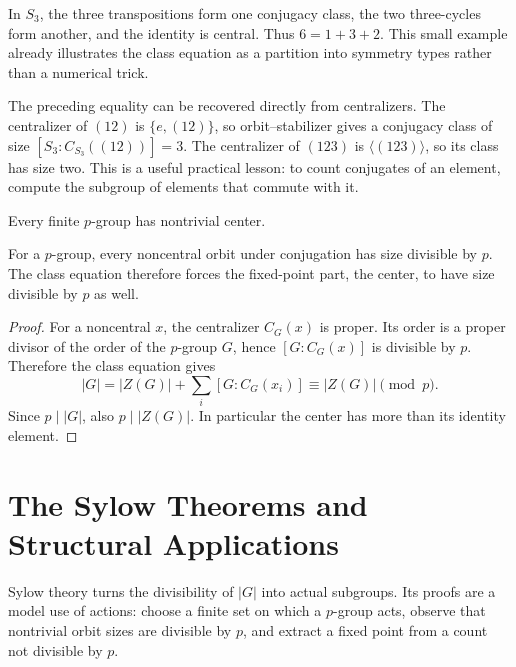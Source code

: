 \begin{example}
In \(S_3\), the three transpositions form one conjugacy class, the two
three-cycles form another, and the identity is central.  Thus
\(6=1+3+2\).  This small example already illustrates the class equation as a
partition into symmetry types rather than a numerical trick.
\end{example}

\begin{example}[Centralizers in \(S_3\)]
The preceding equality can be recovered directly from centralizers.  The
centralizer of \((12)\) is \(\{e,(12)\}\), so orbit--stabilizer gives a
conjugacy class of size \([S_3:C_{S_3}((12))]=3\).  The centralizer of
\((123)\) is \(\langle(123)\rangle\), so its class has size two.  This is a
useful practical lesson: to count conjugates of an element, compute the
subgroup of elements that commute with it.
\end{example}

\begin{corollary}
Every finite \(p\)-group has nontrivial center.
\end{corollary}
\begin{proofidea}
For a \(p\)-group, every noncentral orbit under conjugation has size divisible
by \(p\).  The class equation therefore forces the fixed-point part, the
center, to have size divisible by \(p\) as well.
\end{proofidea}
\begin{proof}
For a noncentral \(x\), the centralizer \(C_G(x)\) is proper.  Its order is a
proper divisor of the order of the \(p\)-group \(G\), hence
\([G:C_G(x)]\) is divisible by \(p\).  Therefore the class equation gives
\[|G|=|Z(G)|+\sum_i[G:C_G(x_i)]\equiv|Z(G)|\pmod p.\]
Since \(p\mid|G|\), also \(p\mid|Z(G)|\).  In particular the center has more
than its identity element.
\end{proof}

\section{The Sylow Theorems and Structural Applications}

Sylow theory turns the divisibility of \(|G|\) into actual subgroups.  Its
proofs are a model use of actions: choose a finite set on which a \(p\)-group
acts, observe that nontrivial orbit sizes are divisible by \(p\), and extract
a fixed point from a count not divisible by \(p\).

